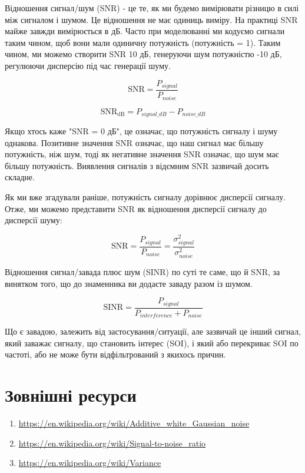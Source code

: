 Відношення сигнал/шум (SNR) - це те, як ми будемо вимірювати різницю в
силі між сигналом і шумом. Це відношення не має одиниць виміру. На
практиці SNR майже завжди вимірюється в дБ. Часто при моделюванні ми
кодуємо сигнали таким чином, щоб вони мали одиничну потужність
(потужність = 1). Таким чином, ми можемо створити SNR 10 дБ, генеруючи
шум потужністю -10 дБ, регулюючи дисперсію під час генерації шуму.

\[\mathrm{SNR} = \frac{P_{signal}}{P_{noise}}\]

\[\mathrm{SNR_{dB}} = P_{signal\_dB} - P_{noise\_dB}\]

Якщо хтось каже "SNR = 0 дБ", це означає, що потужність сигналу і шуму
однакова. Позитивне значення SNR означає, що наш сигнал має більшу
потужність, ніж шум, тоді як негативне значення SNR означає, що шум має
більшу потужність. Виявлення сигналів з від\textquotesingle ємним SNR
зазвичай досить складне.

Як ми вже згадували раніше, потужність сигналу дорівнює дисперсії
сигналу. Отже, ми можемо представити SNR як відношення дисперсії сигналу
до дисперсії шуму:

\[\mathrm{SNR} = \frac{P_{signal}}{P_{noise}} = \frac{\sigma^2_{signal}}{\sigma^2_{noise}}\]

Відношення сигнал/завада плюс шум (SINR) по суті те саме, що й SNR, за
винятком того, що до знаменника ви додаєте заваду разом із шумом.

\[\mathrm{SINR} = \frac{P_{signal}}{P_{interference} + P_{noise}}\]

Що є завадою, залежить від застосування/ситуації, але зазвичай це інший
сигнал, який заважає сигналу, що становить інтерес (SOI), і який або
перекриває SOI по частоті, або не може бути відфільтрований з якихось
причин.

\section{Зовнішні
ресурси}\label{ux437ux43eux432ux43dux456ux448ux43dux456-ux440ux435ux441ux443ux440ux441ux438}

\begin{enumerate}
\def\labelenumi{\arabic{enumi}.}
\tightlist
\item
  \url{https://en.wikipedia.org/wiki/Additive_white_Gaussian_noise}
\item
  \url{https://en.wikipedia.org/wiki/Signal-to-noise_ratio}
\item
  \url{https://en.wikipedia.org/wiki/Variance}
\end{enumerate}
